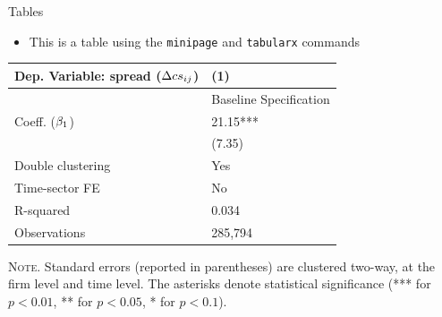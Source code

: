 \documentclass[10pt,itemsep]{beamer}
\begin{document}
\begin{frame}
    {Tables}
    \begin{itemize}
        \item This is a table using the \texttt{minipage} and \texttt{tabularx} commands
    \end{itemize}
    \begin{table}[th]
        \centering%
        \begin{minipage}[b]{.5\textwidth}
            \vspace{.2cm}\tablesize
            \begin{tabularx}{\textwidth}{lY}
                \toprule
                Dep. Variable: spread ($\Delta cs_{ij}$) 	& (1)\\
                \midrule
                & {Baseline Specification} \\
                \midrule
                 Coeff. ($\beta_1$) 		&  21.15*** \\
                &   (7.35) \\
                \midrule
                 Double clustering 		& Yes \\
                Time-sector FE 												& No \\
                 R-squared 					& 0.034 \\
                Observations 												& 285,794 \\\bottomrule
            \end{tabularx}\vspace{.2cm}\newline
            \tiny{{\scshape Note.} Standard errors (reported in parentheses) are clustered two-way, at the firm level and time level. The asterisks denote statistical significance (*** for $p<0.01$, ** for $p<0.05$, * for $p<0.1$).\newline}%
            \label{tab:label2}%
        \end{minipage}
    \end{table}
\end{frame}
\shownotesblock{}
\end{document}
